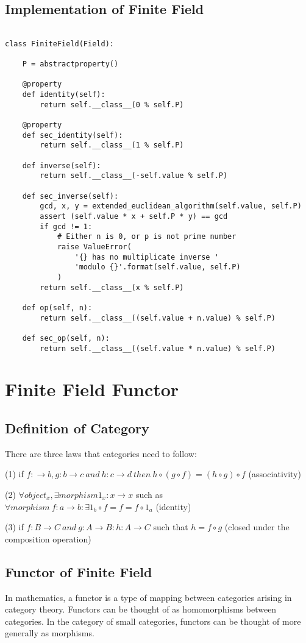\documentclass{article}
\begin{document}
\subsection{Implementation of Finite Field}
\begin{lstlisting}
  
class FiniteField(Field):

    P = abstractproperty()

    @property
    def identity(self):
        return self.__class__(0 % self.P)

    @property
    def sec_identity(self):
        return self.__class__(1 % self.P)

    def inverse(self):
        return self.__class__(-self.value % self.P)

    def sec_inverse(self):
        gcd, x, y = extended_euclidean_algorithm(self.value, self.P)
        assert (self.value * x + self.P * y) == gcd
        if gcd != 1:
            # Either n is 0, or p is not prime number
            raise ValueError(
                '{} has no multiplicate inverse '
                'modulo {}'.format(self.value, self.P)
            )
        return self.__class__(x % self.P)

    def op(self, n):
        return self.__class__((self.value + n.value) % self.P)

    def sec_op(self, n):
        return self.__class__((self.value * n.value) % self.P)

\end{lstlisting}

\section{Finite Field Functor}
\subsection{Definition of Category}
There are three laws that categories need to follow:

(1) if $f: \rightarrow b, g: b \rightarrow c\ and\ h: c \rightarrow d\ then\ h \circ (g\circ f)=(h\circ g)\circ f$ (associativity)

(2) $\forall object_x,\exists morphism 1_x: x \rightarrow x$ such as $\forall morphism\ f:a\rightarrow b: \exists 1_b \circ f=f=f\circ 1_a$ (identity)

(3) if $f: B \rightarrow C\ and\ g: A \rightarrow B: h: A \rightarrow C$ such that $h=f \circ g$ (closed under the composition operation)
\subsection{Functor of Finite Field}
In mathematics, a functor is a type of mapping between categories arising in category theory. Functors can be thought of as homomorphisms between categories. In the category of small categories, functors can be thought of more generally as morphisms.\cite{WikiFunctor}
\end{document}
